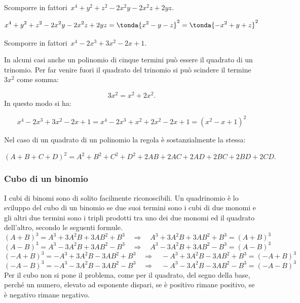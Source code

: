 \begin{esempio}{}{}
Scomporre in fattori~\(x^4+y^{2}+z^{2}-2x^2y-2x^2z+2yz\).

\vspace{-2.0em}
\[x^4+y^{2}+z^{2}-2x^2y-2x^2z+2yz=
  \tonda{x^2-y-z}^{2}=\tonda{-x^2+y+z}^{2}\]
\end{esempio}

\begin{esempio}{}{}
Scomporre in fattori~\(x^4-2x^3+3x^2-2x+1\).

In alcuni casi anche un polinomio di cinque termini può essere il 
quadrato di un trinomio.
Per far venire fuori il quadrato del trinomio si può scindere il 
termine~\(3x^2\) come somma:

\vspace{-1.5em}
\[3x^2=x^2+2x^2.\]
In questo modo si ha:

\vspace{-1.5em}
\[x^4-2x^3+3x^2-2x+1=x^4-2x^3+x^2+2x^2-2x+1=(x^2-x+1)^{2}\]
\end{esempio}

Nel caso di un quadrato di un polinomio la regola è sostanzialmente la 
stessa:

\vspace{-1.0em}
\begin{equation*}
(A+B+C+D)^{2}=A^{2}+B^{2}+C^{2}+D^{2}+2AB+2AC+2AD+2BC+2BD+2CD.
\end{equation*}

\subsubsection{Cubo di un binomio}
\label{subsubsec:divpol_cubobin}

I cubi di binomi sono di solito facilmente riconoscibili. 
Un quadrinomio è lo sviluppo del cubo di un binomio se due suoi termini 
sono i cubi di due monomi e gli altri due termini sono i tripli prodotti 
tra uno dei due monomi ed il quadrato dell'altro, secondo le seguenti 
formule.
\[(A+B)^{3}=A^{3}+3A^{2}B+3AB^{2}+B^{3}\quad \Rightarrow \quad 
A^{3}+3A^{2}B+3AB^{2}+B^{3}=(A+B)^{3}\]
\[(A-B)^{3}=A^{3}-3A^{2}B+3AB^{2}-B^{3}\quad \Rightarrow \quad 
A^{3}-3A^{2}B+3AB^{2}-B^{3}=(A-B)^{3}\]
\[(-A+B)^{3}=-A^{3}+3A^{2}B-3AB^{2}+B^{3}\quad \Rightarrow \quad 
-A^{3}+3A^{2}B-3AB^{2}+B^{3}=(-A+B)^{3}\]
\[(-A-B)^{3}=-A^{3}-3A^{2}B-3AB^{2}-B^{3}\quad \Rightarrow \quad 
-A^{3}-3A^{2}B-3AB^{2}-B^{3}=(-A-B)^{3}\]
Per il cubo non si pone il problema, come per il quadrato, del segno 
della base, perché un numero, elevato ad esponente dispari, se è 
positivo rimane positivo, se è negativo rimane negativo.

